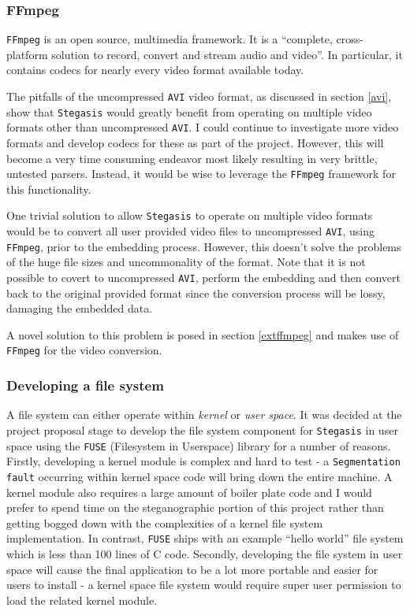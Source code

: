 \documentclass[paper=a4, fontsize=11pt,twoside]{scrartcl}    %
\numberwithin{table}{section}
\numberwithin{figure}{section}
\numberwithin{algorithm}{section}
\begin{document}
\subsubsection{FFmpeg}
\label{ffmpeg}

\texttt{FFmpeg} is an open source, multimedia framework. It is a ``complete, cross-platform solution to record, convert and stream audio and video''. In particular, it contains codecs for nearly every video format available today.  

The pitfalls of the uncompressed \texttt{AVI} video format, as discussed in section \ref{avi}, show that \texttt{Stegasis} would greatly benefit from operating on multiple video formats other than uncompressed \texttt{AVI}. I could continue to investigate more video formats and develop codecs for these as part of the project. However, this will become a very time consuming endeavor most likely resulting in very brittle, untested parsers. Instead, it would be wise to leverage the \texttt{FFmpeg} framework for this functionality.

One trivial solution to allow \texttt{Stegasis} to operate on multiple video formats would be to convert all user provided video files to uncompressed \texttt{AVI}, using \texttt{FFmpeg}, prior to the embedding process. However, this doesn't solve the problems of the huge file sizes and uncommonality of the format. Note that it is not possible to covert to uncompressed \texttt{AVI}, perform the embedding and then convert back to the original provided format since the conversion process will be lossy, damaging the embedded data.

A novel solution to this problem is posed in section \ref{extffmpeg} and makes use of \texttt{FFmpeg} for the video conversion.

\subsubsection{Developing a file system}
\label{fs}

A file system can either operate within \textit{kernel} or \textit{user space}. It was decided at the project proposal stage to develop the file system component for \texttt{Stegasis} in user space using the \texttt{FUSE} (Filesystem in Userspace) library for a number of reasons. Firstly, developing a kernel module is complex and hard to test - a \texttt{Segmentation fault} occurring within kernel space code will bring down the entire machine. A kernel module also requires a large amount of boiler plate code and I would prefer to spend time on the steganographic portion of this project rather than getting bogged down with the complexities of a kernel file system implementation. In contrast, \texttt{FUSE} ships with an example ``hello world'' file system which is less than 100 lines of C code. Secondly, developing the file system in user space will cause the final application to be a lot more portable and easier for users to install - a kernel space file system would require super user permission to load the related kernel module.
\end{document}
